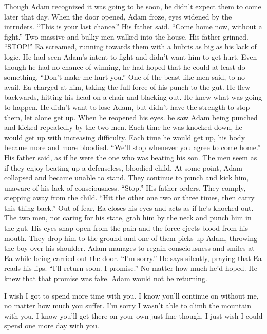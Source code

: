 \documentclass[openany, 12pt]{book}
\newcommand\tab[1][1cm]{\hspace*{#1}}
\begin{document}
\begin{itshape}
\newline
\tab
Though Adam recognized it was going to be soon, he didn’t expect them to come later that day. When the door opened, Adam froze, eyes widened by the intruders. ``This is your last chance.'' His father said. ``Come home now, without a fight.'' Two massive and bulky men walked into the house. His father grinned.
\newline
\tab
``STOP!'' Ea screamed, running towards them with a hubris as big as his lack of logic. He had seen Adam’s intent to fight and didn’t want him to get hurt. Even though he had no chance of winning, he had hoped that he could at least do something.
\newline
\tab
``Don’t make me hurt you.'' One of the beast-like men said, to no avail. Ea charged at him, taking the full force of his punch to the gut. He flew backwards, hitting his head on a chair and blacking out. He knew what was going to happen. He didn’t want to lose Adam, but didn’t have the strength to stop them, let alone get up. When he reopened his eyes. he saw Adam being punched and kicked repeatedly by the two men. Each time he was knocked down, he would get up with increasing difficulty. Each time he would get up, his body became more and more bloodied.
\newline
\tab
``We’ll stop whenever you agree to come home.'' His father said, as if he were the one who was beating his son. The men seem as if they enjoy beating up a defenseless, bloodied child. At some point, Adam collapsed and became unable to stand. They continue to punch and kick him, unaware of his lack of consciousness. ``Stop.'' His father orders. They comply, stepping away from the child. ``Hit the other one two or three times, then carry this thing back.''
\newline
\tab
Out of fear, Ea closes his eyes and acts as if he’s knocked out. The two men, not caring for his state, grab him by the neck and punch him in the gut. His eyes snap open from the pain and the force ejects blood from his mouth. They drop him to the ground and one of them picks up Adam, throwing the boy over his shoulder. Adam manages to regain consciousness and smiles at Ea while being carried out the door. ``I’m sorry.'' He says silently, praying that Ea reads his lips. ``I’ll return soon. I promise.'' No matter how much he’d hoped. He knew that that promise was fake. Adam would not be returning.
\end{itshape}
\newline
\newline
\tab
I wish I got to spend more time with you. I know you’ll continue on without me, no matter how much you suffer. I’m sorry I wasn’t able to climb the mountain with you. I know you’ll get there on your own just fine though. I just wish I could spend one more day with you.
\end{document}
